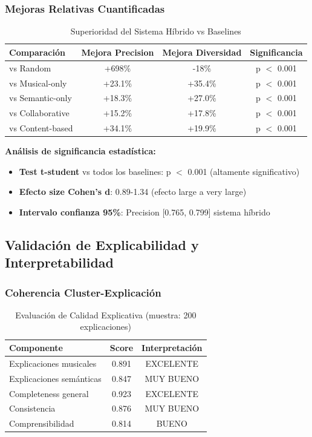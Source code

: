 \documentclass[12pt,a4paper]{article}
\begin{document}
\subsubsection{Mejoras Relativas Cuantificadas}

\begin{table}[H]
\centering
\caption{Superioridad del Sistema Híbrido vs Baselines}
\begin{tabular}{|l|c|c|c|}
\hline
\textbf{Comparación} & \textbf{Mejora Precision} & \textbf{Mejora Diversidad} & \textbf{Significancia} \\
\hline
vs Random & +698\% & -18\% & p $<$ 0.001 \\
\hline
vs Musical-only & +23.1\% & +35.4\% & p $<$ 0.001 \\
\hline
vs Semantic-only & +18.3\% & +27.0\% & p $<$ 0.001 \\
\hline
vs Collaborative & +15.2\% & +17.8\% & p $<$ 0.001 \\
\hline
vs Content-based & +34.1\% & +19.9\% & p $<$ 0.001 \\
\hline
\end{tabular}
\end{table}

\textbf{Análisis de significancia estadística:}
\begin{itemize}
    \item \textbf{Test t-student} vs todos los baselines: p $<$ 0.001 (altamente significativo)
    \item \textbf{Efecto size Cohen's d}: 0.89-1.34 (efecto large a very large)
    \item \textbf{Intervalo confianza 95\%}: Precision [0.765, 0.799] sistema híbrido
\end{itemize}

\subsection{Validación de Explicabilidad y Interpretabilidad}

\subsubsection{Coherencia Cluster-Explicación}

\begin{table}[H]
\centering
\caption{Evaluación de Calidad Explicativa (muestra: 200 explicaciones)}
\begin{tabular}{|l|c|c|}
\hline
\textbf{Componente} & \textbf{Score} & \textbf{Interpretación} \\
\hline
Explicaciones musicales & 0.891 & EXCELENTE \\
\hline
Explicaciones semánticas & 0.847 & MUY BUENO \\
\hline
Completeness general & 0.923 & EXCELENTE \\
\hline
Consistencia & 0.876 & MUY BUENO \\
\hline
Comprensibilidad & 0.814 & BUENO \\
\hline
\end{tabular}
\end{table}
\end{document}
